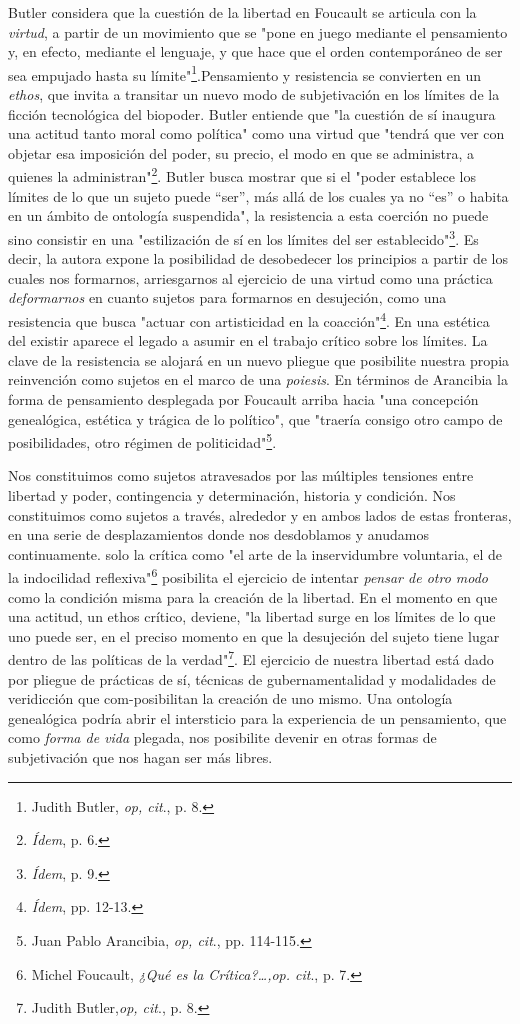 \documentclass{book}
\begin{document}
Butler considera que la cuestión de la libertad en Foucault se articula
con la \emph{virtud}, a partir de un movimiento que se "pone en juego
mediante el pensamiento y, en efecto, mediante el lenguaje, y que hace
que el orden contemporáneo de ser sea empujado hasta su
límite"\footnote{Judith Butler, \emph{op, cit}., p. 8.}.Pensamiento y
resistencia se convierten en un \emph{ethos}, que invita a transitar un
nuevo modo de subjetivación en los límites de la ficción tecnológica del
biopoder. Butler entiende que "la cuestión de sí inaugura una actitud
tanto moral como política" como una virtud que "tendrá que ver con
objetar esa imposición del poder, su precio, el modo en que se
administra, a quienes la administran"\footnote{\emph{Ídem}, p. 6.}.
Butler busca mostrar que si el "poder establece los límites de lo que un
sujeto puede ``ser'', más allá de los cuales ya no ``es'' o habita en un
ámbito de ontología suspendida", la resistencia a esta coerción no puede
sino consistir en una "estilización de sí en los límites del ser
establecido"\footnote{\emph{Ídem}, p. 9.}. Es decir, la autora expone la
posibilidad de desobedecer los principios a partir de los cuales nos
formarnos, arriesgarnos al ejercicio de una virtud como una práctica
\emph{deformarnos} en cuanto sujetos para formarnos en desujeción, como
una resistencia que busca "actuar con artisticidad en la
coacción"\footnote{\emph{Ídem}, pp. 12-13.}. En una estética del existir
aparece el legado a asumir en el trabajo crítico sobre los límites. La
clave de la resistencia se alojará en un nuevo pliegue que posibilite
nuestra propia reinvención como sujetos en el marco de una
\emph{poiesis}. En términos de Arancibia la forma de pensamiento
desplegada por Foucault arriba hacia "una concepción genealógica,
estética y trágica de lo político", que "traería consigo otro campo de
posibilidades, otro régimen de politicidad"\footnote{Juan Pablo
  Arancibia, \emph{op, cit}., pp. 114-115.}.

Nos constituimos como sujetos atravesados por las múltiples tensiones
entre libertad y poder, contingencia y determinación, historia y
condición. Nos constituimos como sujetos a través, alrededor y en ambos
lados de estas fronteras, en una serie de desplazamientos donde nos
desdoblamos y anudamos continuamente. solo la crítica como "el arte de
la inservidumbre voluntaria, el de la indocilidad reflexiva"\footnote{Michel
  Foucault, \emph{¿Qué es la Crítica?\ldots,op. cit}., p. 7.} posibilita
el ejercicio de intentar \emph{pensar de otro modo} como la condición
misma para la creación de la libertad. En el momento en que una actitud,
un ethos crítico, deviene, "la libertad surge en los límites de lo que
uno puede ser, en el preciso momento en que la desujeción del sujeto
tiene lugar dentro de las políticas de la verdad"\footnote{Judith
  Butler,\emph{op, cit}., p. 8.}. El ejercicio de nuestra libertad está
dado por pliegue de prácticas de sí, técnicas de gubernamentalidad y
modalidades de veridicción que com-posibilitan la creación de uno mismo.
Una ontología genealógica podría abrir el intersticio para la
experiencia de un pensamiento, que como \emph{forma de vida} plegada,
nos posibilite devenir en otras formas de subjetivación que nos hagan
ser más libres.
\end{document}
